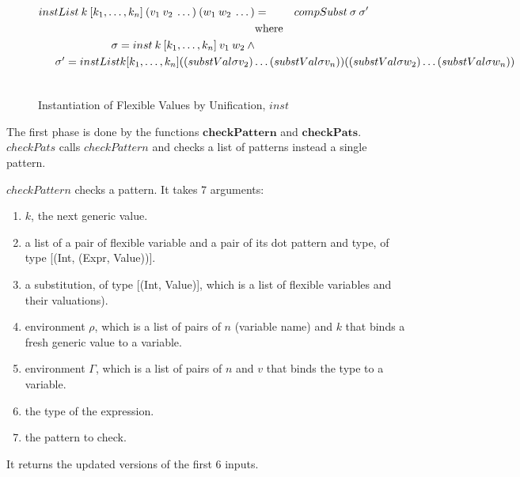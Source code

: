 \begin{figure}[H]
\begin{equation*}
\begin{aligned}
      instList \: k \: [k_1,\dots,k_n] \: (v_1 \: v_2 \: \dots) \: (w_1 \: w_2 \: \dots) & =              & compSubst \: \sigma \: \sigma'                                                                                                                                    \\
                                                                                         & \textrm{where} &                                                                                                                                                                   \\
      \sigma = inst \: k \: [k_1,\dots,k_n] \: v_1 \: w_2 \: \land                       &                &                                                                                                                                                                   \\
      \noalign{$\sigma'                                                                             =               instList \: k [k_1,\dots,k_n] \: ((substVal \sigma \: v_2) \dots (substVal \sigma \: v_n)) \: ((substVal \sigma \: w_2) \dots (substVal \sigma \: w_n))$} \\
    \end{aligned}
  \end{equation*}
  \caption{Instantiation of Flexible Values by Unification, $inst$}
\end{figure}

The first phase is done by the functions $\boldsymbol{checkPattern}$ and $\boldsymbol{checkPats}$. $checkPats$ calls $checkPattern$ and checks a list of patterns instead a single pattern.

$checkPattern$ checks a pattern. It takes 7 arguments:

\begin{enumerate}
  \item $k$, the next generic value.
  \item a list of a pair of flexible variable and a pair of its dot pattern and type, of type [(Int, (Expr, Value))].
  \item a substitution, of type [(Int, Value)], which is a list of flexible variables and their valuations).
  \item environment $\rho$, which is a list of pairs of $n$ (variable name) and $k$ that binds a fresh generic value to a variable.
  \item environment $\Gamma$, which is a list of pairs of $n$ and $v$ that binds the type to a variable.
  \item the type of the expression.
  \item the pattern to check.
\end{enumerate}

It returns the updated versions of the first 6 inputs.

